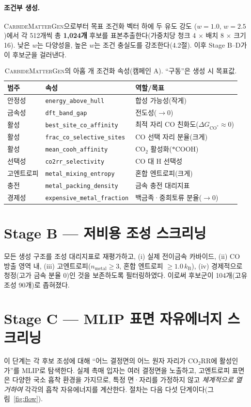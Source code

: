 \documentclass[11pt,a4paper]{report}
\newcommand{\dGCO}{\Delta G_{\mathrm{CO^*}}}
\begin{document}
\paragraph{조건부 생성.} \textsc{CarbideMatterGen}으로부터 목표 조건화 벡터 하에 두 유도 강도
($w=1.0$, $w=2.5$)에서 각 512개씩 총 \textbf{1{,}024개} 후보를 표본추출한다(가중치당 청크 4 $\times$
배치 8 $\times$ 크기 16). 낮은 $w$는 다양성을, 높은 $w$는 조건 충실도를 강조한다(4.2절). 이후
Stage B--D가 이 후보군을 걸러낸다.

\begin{table}[t]
\centering
\caption{\textsc{CarbideMatterGen}의 아홉 개 조건화 속성(캠페인 A). ``구동''은 생성 시 목표값.}
\label{tab:props}
\small
\begin{tabular}{lll}
\hline
범주 & 속성 & 역할/목표 \\
\hline
안정성   & \texttt{energy\_above\_hull}        & 합성 가능성(작게) \\
금속성   & \texttt{dft\_band\_gap}             & 전도성($\to 0$) \\
활성     & \texttt{best\_site\_co\_affinity}   & 최적 자리 CO 친화도($\dGCO\!\approx\!0$) \\
활성     & \texttt{frac\_co\_selective\_sites} & CO 선택 자리 분율(크게) \\
활성     & \texttt{mean\_cooh\_affinity}       & CO$_2$ 활성화($*$COOH) \\
선택성   & \texttt{co2rr\_selectivity}         & CO 대 H 선택성 \\
고엔트로피 & \texttt{metal\_mixing\_entropy}   & 혼합 엔트로피(크게) \\
충전     & \texttt{metal\_packing\_density}    & 금속 충전 대리지표 \\
경제성   & \texttt{expensive\_metal\_fraction} & 백금족·중희토류 분율($\to 0$) \\
\hline
\end{tabular}
\end{table}

\section{Stage B --- 저비용 조성 스크리닝}
모든 생성 구조를 조성 대리지표로 재평가하고, (i) 실제 전이금속 카바이드, (ii) CO 방출 영역 내,
(iii) 고엔트로피($n_\mathrm{metal}\ge 3$, 혼합 엔트로피 $\ge\!1.0\,k_\mathrm{B}$), (iv) 경제적으로
청정(고가 금속 분율 0)인 것을 보존하도록 필터링하였다. 이로써 후보군이 104개(고유 조성 90개)로
좁혀졌다.

\section{Stage C --- MLIP 표면 자유에너지 스크리닝}
\label{sec:methods-surf}
이 단계는 각 후보 조성에 대해 ``어느 결정면의 어느 원자 자리가 CO$_2$RR에 활성인가''를 MLIP로
탐색한다. 실제 촉매 입자는 여러 결정면을 노출하고, 고엔트로피 표면은 다양한 국소 흡착 환경을
가지므로, 특정 면·자리를 가정하지 않고 \emph{체계적으로 열거하여} 각각의 흡착 자유에너지를 계산한다.
절차는 다음 다섯 단계이다(그림~\ref{fig:flow}).
\end{document}
